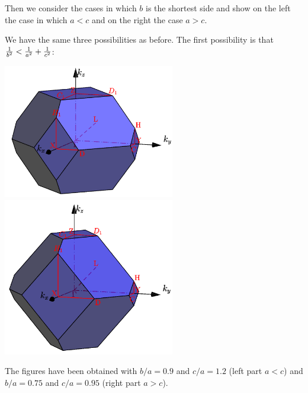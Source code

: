 \documentclass[12pt,a4paper]{article}
\begin{document}
Then we consider the cases in which $b$ is the shortest side and show
on the left the case in which $a<c$ and on the right the case $a>c$. 

We have the same three possibilities as before. The first possibility
is that ${1 \over b^2} < {1\over a^2} + {1\over c^2}$: 
\begin{center}
\includegraphics[width=7.5cm,angle=0]{images/ofc_3.png} \hspace{1cm}
\includegraphics[width=7.5cm,angle=0]{images/ofc_4.png} \hspace{1cm}
\end{center}
The figures have been obtained with $b/a=0.9$ and $c/a=1.2$ 
(left part $a<c$) and $b/a=0.75$ and $c/a=0.95$ (right part $a>c$).
\end{document}
